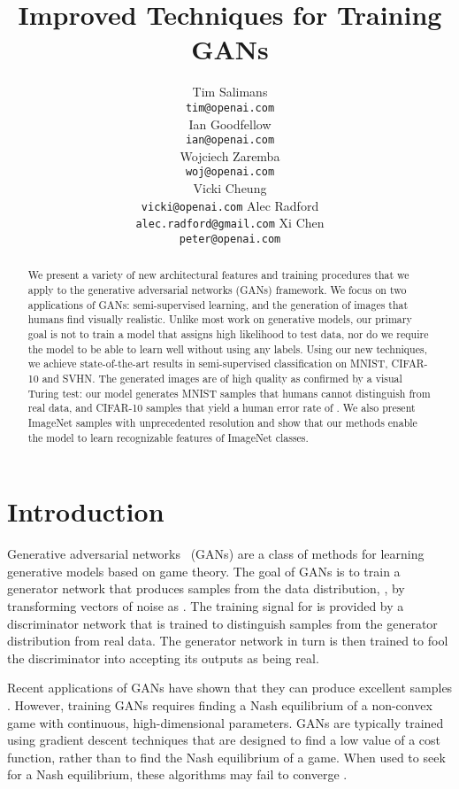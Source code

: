 \documentclass{article} \usepackage{nips14submit_e,times}
\title{Improved Techniques for Training GANs}
\author{Tim Salimans \\
\texttt{tim@openai.com} \\
\And
Ian Goodfellow\\
\texttt{ian@openai.com} \\
\And
Wojciech Zaremba\\
\texttt{woj@openai.com} \\
\And
Vicki  Cheung\\
\texttt{vicki@openai.com}
\And
Alec  Radford\\
\texttt{alec.radford@gmail.com}
\And
Xi Chen\\
\texttt{peter@openai.com}
}
\begin{document}
\setlength{\lineskiplimit}{0pt}
\setlength{\lineskip}{0pt}
\setlength{\abovedisplayskip}{2pt}
\setlength{\belowdisplayskip}{0pt}

\maketitle

\begin{abstract}
We present a variety of new architectural features and training procedures that we apply
to the generative adversarial networks (GANs) framework.
We focus on two applications of GANs: semi-supervised learning, and the generation of
images that humans find visually realistic.
Unlike most work on generative models, our primary goal is not to train a model that assigns
high likelihood to test data, nor do we require the model to be able to learn well without using any
labels. Using our new techniques, we achieve state-of-the-art results in semi-supervised classification
on MNIST, CIFAR-10 and SVHN.
The generated images are of high quality as confirmed by a visual Turing test: 
our model generates MNIST samples that humans cannot distinguish from real data,
and CIFAR-10 samples that yield a human error rate of .
We also present ImageNet samples with unprecedented resolution and show that
our methods enable the model to learn recognizable features of ImageNet classes.
\end{abstract}



\section{Introduction}
Generative adversarial networks~\cite{goodfellow2014generative} (GANs) are a class of methods for learning generative models
based on game theory. The goal of GANs is to train a generator network  that produces samples from the
data distribution, , by transforming vectors of noise  as . The training signal for  is provided by a discriminator network  that is trained to distinguish samples from the generator distribution  from real data. The generator network  in turn is then trained to fool the discriminator into accepting its outputs as being real.

Recent applications of GANs have shown that they can produce excellent samples \cite{denton2015deep, radford2015unsupervised}.
However, training GANs requires finding a Nash equilibrium of a non-convex game
with continuous, high-dimensional parameters.
GANs are typically trained using gradient descent techniques that are designed to
find a low value of a cost function, rather than to find the Nash equilibrium of
a game.
When used to seek for a Nash equilibrium, these algorithms 
may fail to converge \cite{goodfellow2014distinguishability}.
\end{document}
